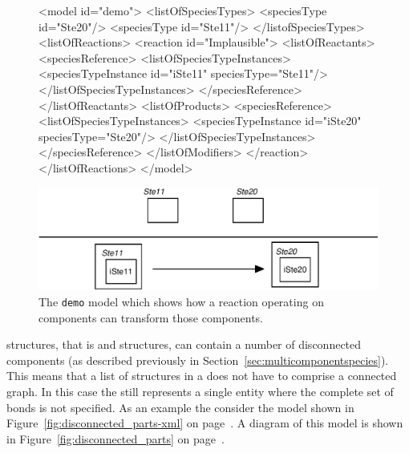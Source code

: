 \documentclass{cekarticle}
\begin{document}
\begin{figure}[h]

\begin{example}
<model id="demo">
    <listOfSpeciesTypes>
        <speciesType id="Ste20"/>
        <speciesType id="Ste11"/>
    </listofSpeciesTypes>
    <listOfReactions>
        <reaction id="Implausible">
            <listOfReactants>
                <speciesReference>
                    <listOfSpeciesTypeInstances>
                        <speciesTypeInstance id="iSte11" speciesType="Ste11"/>
                    </listOfSpeciesTypeInstances>
                </speciesReference>
            </listOfReactants>
            <listOfProducts>
                <speciesReference>
                    <listOfSpeciesTypeInstances>
                        <speciesTypeInstance id="iSte20" speciesType="Ste20"/>
                    </listOfSpeciesTypeInstances>
                </speciesReference>
            </listOfModifiers>
        </reaction>
    </listOfReactions>
</model>
\end{example}
  \vspace*{8pt}
  \centering
  \includegraphics[scale = 0.7]{demo.eps}
  \caption{The \texttt{demo} model which shows how a reaction operating on
  components can transform those components.}
  \label{fig:demo}
\end{figure}

 structures, that is  and
 structures, can contain a number of
disconnected components (as described previously in
Section~\ref{sec:multicomponentspecies}).  This means that a list
of  structures in a  does not have
to comprise a connected graph. In this case the
 still represents a single entity where the
complete set of bonds is not specified.  As an example the
consider the model shown in
Figure~\ref{fig:disconnected_parts-xml} on
page~\pageref{fig:disconnected_parts-xml}.  A diagram of this
model is shown in Figure~\ref{fig:disconnected_parts} on
page~\pageref{fig:disconnected_parts}.
\end{document}
